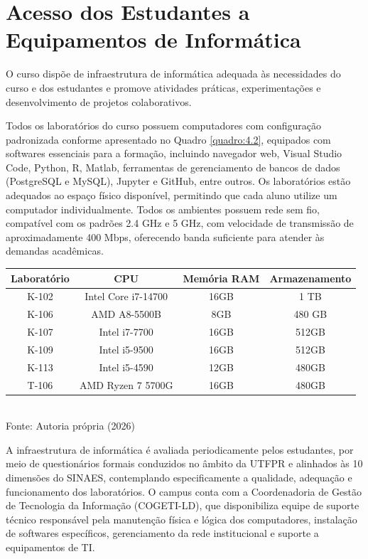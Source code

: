\section{Acesso dos Estudantes a Equipamentos de Informática}

O curso dispõe de infraestrutura de informática adequada às necessidades do curso e dos estudantes e promove atividades práticas, experimentações e desenvolvimento de projetos colaborativos.

Todos os laboratórios do curso possuem computadores com configuração padronizada conforme apresentado no Quadro \ref{quadro:4.2}, equipados com softwares essenciais para a formação, incluindo navegador web, Visual Studio Code, Python, R, Matlab, ferramentas de gerenciamento de bancos de dados (PostgreSQL e MySQL), Jupyter e GitHub, entre outros. Os laboratórios estão adequados ao espaço físico disponível, permitindo que cada aluno utilize um computador individualmente. Todos os ambientes possuem rede sem fio, compatível com os padrões 2.4 GHz e 5 GHz, com velocidade de transmissão de aproximadamente 400 Mbps, oferecendo banda suficiente para atender às demandas acadêmicas.

\begin{quadro}[htb]
    \centering
    \caption{Configuração dos computadores do laboratório do curso CD/IA}
    \label{quadro:4.2}
    \vspace{0.2cm}
    \begin{tabular}{|c|c|c|c|}
        \hline
        \textbf{Laboratório} & \textbf{CPU} & \textbf{Memória RAM} & \textbf{Armazenamento} \\ \hline
        K-102 & Intel Core i7-14700 & 16GB & 1 TB \\ \hline
        K-106 & AMD A8-5500B & 8GB & 480 GB \\ \hline
        K-107 & Intel i7-7700 & 16GB & 512GB \\ \hline
        K-109 & Intel i5-9500 & 16GB & 512GB \\ \hline
        K-113 & Intel i5-4590 & 12GB & 480GB \\ \hline
        T-106 & AMD Ryzen 7 5700G & 16GB & 480GB \\ \hline
    \end{tabular}
    \small \\ Fonte: Autoria própria (2026)
\end{quadro}

A infraestrutura de informática é avaliada periodicamente pelos estudantes, por meio de questionários formais conduzidos no âmbito da UTFPR e alinhados às 10 dimensões do SINAES, contemplando especificamente a qualidade, adequação e funcionamento dos laboratórios. O campus conta com a Coordenadoria de Gestão de Tecnologia da Informação (COGETI-LD), que disponibiliza equipe de suporte técnico responsável pela manutenção física e lógica dos computadores, instalação de softwares específicos, gerenciamento da rede institucional e suporte a equipamentos de TI.

